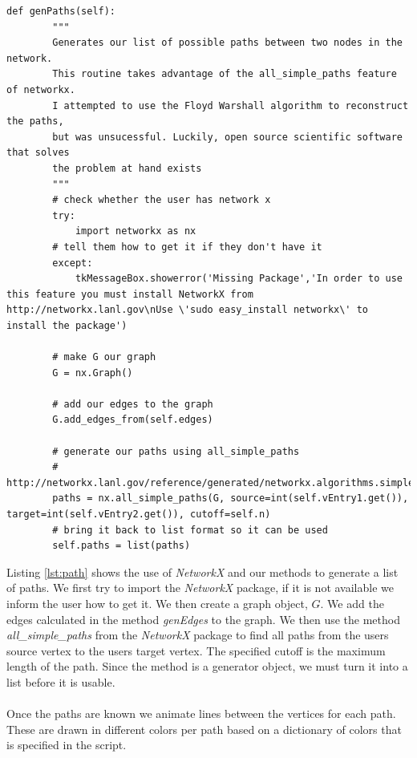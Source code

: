 \begin{lstlisting}[caption={Path Generation}, label=lst:path,firstnumber=83]
    def genPaths(self):
        """
        Generates our list of possible paths between two nodes in the network.
        This routine takes advantage of the all_simple_paths feature of networkx.
        I attempted to use the Floyd Warshall algorithm to reconstruct the paths,
        but was unsucessful. Luckily, open source scientific software that solves
        the problem at hand exists
        """
        # check whether the user has network x
        try:
            import networkx as nx
        # tell them how to get it if they don't have it
        except:
            tkMessageBox.showerror('Missing Package','In order to use this feature you must install NetworkX from http://networkx.lanl.gov\nUse \'sudo easy_install networkx\' to install the package')
        
        # make G our graph
        G = nx.Graph()
        
        # add our edges to the graph
        G.add_edges_from(self.edges)
        
        # generate our paths using all_simple_paths
        # http://networkx.lanl.gov/reference/generated/networkx.algorithms.simple_paths.all_simple_paths.html
        paths = nx.all_simple_paths(G, source=int(self.vEntry1.get()), target=int(self.vEntry2.get()), cutoff=self.n)
        # bring it back to list format so it can be used
        self.paths = list(paths)
\end{lstlisting}\noindent
Listing \ref{lst:path} shows the use of \emph{NetworkX} and our methods to generate a list of paths. We first try to import the \emph{NetworkX} package, if it is not available we inform the user how to get it. We then create a graph object, $G$. We add the edges calculated in the method \emph{genEdges} to the graph. We then use the method \emph{all\_simple\_paths} from the \emph{NetworkX} package to find all paths from the users source vertex to the users target vertex. The specified cutoff is the maximum length of the path. Since the method is a generator object, we must turn it into a list before it is usable.\\\\
Once the paths are known we animate lines between the vertices for each path. These are drawn in different colors per path based on a dictionary of colors that is specified in the script.
